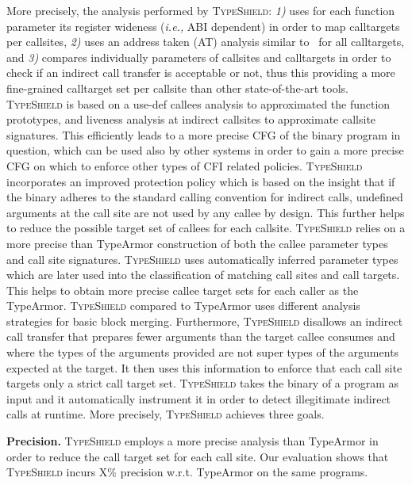 More precisely, the analysis performed by \textsc{TypeShield}:
\textit{1)} uses for each function parameter its register wideness (\textit{i.e.,} ABI dependent) in order to map calltargets per callsites,  
\textit{2)} uses an address taken (AT) analysis similar to~\cite{veen:typearmor} for all calltargets, and 
\textit{3)} compares individually parameters of callsites and calltargets in order to check if an indirect call transfer is acceptable or not, 
thus this providing a more fine-grained calltarget set per callsite than other state-of-the-art tools.
\textsc{TypeShield} is based on a use-def callees analysis to approximated the function prototypes, 
and liveness analysis at indirect callsites to approximate callsite signatures. This 
efficiently leads to a more precise CFG of the binary program in question, 
which can be used also by other systems in order to gain a more precise CFG on which to 
enforce other types of CFI related policies.
\textsc{TypeShield} incorporates an improved protection policy which is
based on the insight that if the binary adheres to the standard calling convention
for indirect calls, undefined arguments at the call site are not used by any callee by design. 
This further helps to reduce the possible target set of callees for each callsite.
\textsc{TypeShield} relies on a more precise than TypeArmor construction of both the callee parameter types and call site signatures.
\textsc{TypeShield} uses automatically inferred parameter types which are later used into the classification of matching call sites and call targets.
This helps to obtain more precise callee target sets for each caller as the TypeArmor.
\textsc{TypeShield} compared to TypeArmor uses different analysis strategies for basic block merging.
Furthermore, \textsc{TypeShield} disallows an indirect call transfer that prepares
fewer arguments than the target callee consumes and where the types of the 
arguments provided are not super types of the arguments expected at the target.
It then uses this information to enforce that each call site targets only a strict call target set.
\textsc{TypeShield} takes the binary of a program as input and it automatically instrument it in order
to detect illegitimate indirect calls at runtime. 
More precisely, \textsc{TypeShield} achieves three goals.

\textbf{Precision.} \textsc{TypeShield} employs a more precise analysis than TypeArmor in order to reduce the call target set for each 
               call site. Our evaluation shows that \textsc{TypeShield} incurs X\% precision w.r.t. TypeArmor on the same programs.

